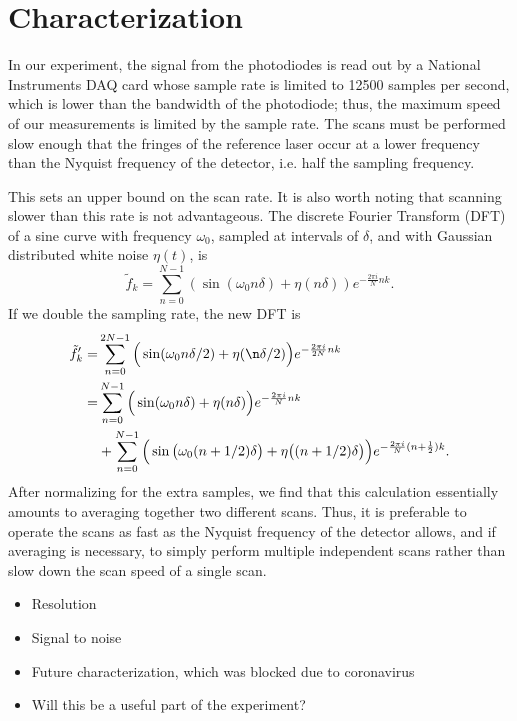 \documentclass[12pt]{puthesis}
\begin{document}
\section{Characterization}

In our experiment, the signal from the photodiodes is read out by a National Instruments DAQ card whose sample rate is limited to 12500 samples per second, which is lower than the bandwidth of the photodiode; thus, the maximum speed of our measurements is limited by the sample rate. The scans must be performed slow enough that the fringes of the reference laser occur at a lower frequency than the Nyquist frequency of the detector, i.e. half the sampling frequency.

This sets an upper bound on the scan rate. It is also worth noting that scanning slower than this rate is not advantageous. The discrete Fourier Transform (DFT) of a sine curve with frequency $\omega_{0}$, sampled at intervals of $\delta$, and with Gaussian distributed white noise $\eta(t)$, is 
\begin{equation}\label{eq:10}
\tilde f_{k} = \sum_{n=0}^{N-1}\left(\sin (\omega_{0}n\delta) +\eta(n\delta)\right)e^{-\frac{2\pi i}{N}nk}. 
\end{equation}
If we double the sampling rate, the new DFT is 
\begin{align}
  \tilde f'_{k}
  =& \sum_{n=0}^{2N-1}\Big(\sin(\omega_{0}n\delta/2) + \eta(\n\delta/2)\Big)e^{-\frac{2\pi i}{2N}nk}\nonumber \\
  =& \sum_{n=0}^{N-1}\Big(\sin(\omega_{0}n\delta)+\eta(n\delta)\Big)e^{-\frac{2\pi i}{N}nk}\nonumber \\
  &+ \sum_{n=0}^{N-1}\Big(\sin\big(\omega_{0}(n+1/2)\delta\big) + \eta\big((n + 1/2)\delta\big) \Big)e^{-\frac{2\pi i}{N}(n+\frac{1}{2})k}.
  \label{eq:11}
\end{align}
After normalizing for the extra samples, we find that this calculation essentially amounts to averaging together two different scans. Thus, it is preferable to operate the scans as fast as the Nyquist frequency of the detector allows, and if averaging is necessary, to simply perform multiple independent scans rather than slow down the scan speed of a single scan.  



\begin{itemize}
\item Resolution

\item Signal to noise 

\item Future characterization, which was blocked due to coronavirus 

\item Will this be a useful part of the experiment?
\end{itemize}
\end{document}
